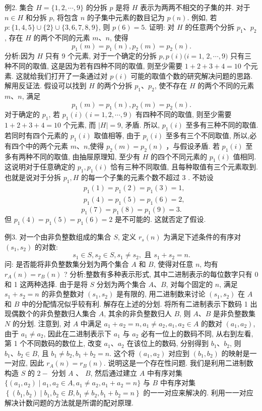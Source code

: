 例2. 集合 $H=\{1,2, \cdots, 9\}$ 的分拆 $p$ 是将 $H$ 表示为两两不相交的子集的并.
对于 $n \in H$ 和分拆 $p$, 将包含 $n$ 的子集中元素的数目记为 $p(n)$. 例如, 若 $p:\{1,4,5\} \cup\{2\} \cup\{3,6,7,8,9\}$, 则 $p(6)=5$. 证明: 对 $H$ 的任意两个分拆 $p_1 、 p_2$, 存在 $H$ 的两个不同的元素 $m 、 n$, 使得
$$
p_1(m)=p_1(n), p_2(m)=p_2(n) .
$$
分析:因为 $H$ 只有 9 个元素, 对于一个确定的分拆 $p, p(i)(i=1$, $2, \cdots, 9)$ 只有三种不同的取值, 这是因为若有四种不同的取值, 则至少需要 $1+2+3+4=10$ 个元素.
这就给我们打开了一条通过对 $p(i)$ 可能的取值个数的研究解决问题的思路.
解用反证法.
假设可以找到 $H$ 的两个分拆 $p_1 、 p_2$, 使不存在 $H$ 的两个不同的元素 $m 、 n$, 满足
$$
p_1(m)=p_1(n), p_2(m)=p_2(n) .
$$
对于确定的 $p_1$, 若 $p_1(i)(i=1,2, \cdots, 9)$ 有四种不同的取值, 则至少需要 $1+2+3+4=10$ 个元素, 而 $|H|=9$, 矛盾.
所以, $p_1(i)$ 至多有三种不同的取值.
若同时有四个元素的 $p_1(i)$ 取值相等, 由于 $p_i(i)$ 至多有三个不同取值, 所以,必有四个中的两个元素 $m 、 n$,使得 $p_2(m)=p_2(n)$ ，与假设矛盾.
若 $p_1(i)$ 至多有两种不同的取值, 由抽屉原理知, 至少有 $H$ 的四个不同元素的 $p_1(i)$ 值相同.
这说明对于任意确定的 $p_1, p_1(i)$ 恰有三种不同取值, 且每种取值有三个元素取到.
也就是说对于分拆 $p_1, H$ 的每一个子集的元素个数不超过 3 . 不妨设
$$
\begin{aligned}
& p_1(1)=p_1(2)=p_1(3)=1, \\
& p_1(4)=p_1(5)=p_1(6)=2,
\end{aligned}
$$
$$
p_1(7)=p_1(8)=p_1(9)=3 .
$$
但 $p_1(4)=p_1(5)=p_1(6)=2$ 是不可能的.
这就否定了假设.



例3. 对一个由非负整数组成的集合 $S$, 定义 $r_s(n)$ 为满足下述条件的有序对 $\left(s_1, s_2\right)$ 的对数:
$$
s_1 \in S, s_2 \in S, s_1 \neq s_2, \text { 且 } s_1+s_2=n .
$$
问: 是否能将非负整数集分划为两个集合 $A$ 和 $B$, 使得对任意 $n$, 均有 $r_A(n)=r_B(n)$ ?
分析:整数有多种表示形式, 其中二进制表示的每位数字只有 0 和 1 这两种选择.
由于是将 $S$ 分划为两个集合 $A 、 B$, 对每个固定的 $n$, 满足 $s_1+s_2=n$ 的非负整数对 $\left(s_1, s_2\right)$ 是有限的, 用二进制数来讨论 $\left(s_1, s_2\right)$ 在 $A$ 和 $B$ 中的分配情况似乎较有利.
解存在上述的分划.
将所有二进制表示下数码 1 出现偶数个的非负整数归人集合 $A$, 其余的非负整数归人 $B$, 则 $A 、 B$ 是非负整数集 $N$ 的分划.
注意到, 对 $A$ 中满足 $a_1+a_2=n, a_1 \neq a_2, a_1, a_2 \in A$ 的数对 $\left(a_1, a_2\right)$, 由于 $a_1 \neq a_2$, 因此在二进制表示下 $a_1$ 与 $a_2$ 必有一位上的数码不同, 从右到左看, 第 1 个不同数码的数位上, 改变 $a_1 、 a_2$ 在该位上的数码, 分别得到 $b_1 、 b_2$, 则 $b_1 、 b_2 \in B$, 且 $b_1 \neq b_2, b_1+b_2=n$. 这个将 $\left(a_1, a_2\right)$ 对应到 $\left(b_1, b_2\right)$ 的映射是一一对应, 因此 $r_A(n)=r_B(n)$.
说明这是一个存在性问题.
我们是利用二进制数构造 $S$ 的 $2-$ 分划 $A$ 、 $B$, 然后通过建立 $A$ 中有序对集 $\{\left(a_1, a_2\right) \mid a_1, a_2 \in A, a_1 \neq a_2, a_1+a_2=n\}$ 与 $B$ 中有序对集 $\left\{\left(b_1, b_2\right) \mid b_1, b_2 \in B, b_1 \neq b_2, b_1+b_2=n\right\}$ 的一一对应来解决的.
利用一一对应解决计数问题的方法就是所谓的配对原理.



